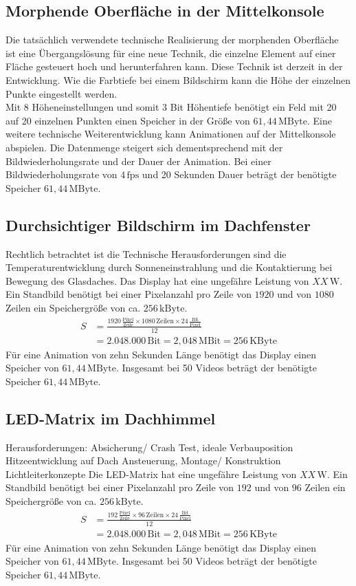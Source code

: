 \subsection{Morphende Oberfläche in der Mittelkonsole}
Die tatsächlich verwendete technische Realisierung der morphenden Oberfläche ist eine Übergangslösung für eine neue Technik, die einzelne Element auf einer Fläche gesteuert hoch und herunterfahren kann. Diese Technik ist derzeit in der Entwicklung. Wie die Farbtiefe bei einem Bildschirm kann die Höhe der einzelnen Punkte eingestellt werden. \\
Mit 8 Höheneinstellungen und somit 3 Bit Höhentiefe benötigt ein Feld mit 20 auf 20 einzelnen Punkten einen Speicher in der Größe von $ 61,44\,\mathrm{MByte}$.
Eine weitere technische Weiterentwicklung kann Animationen auf der Mittelkonsole abspielen. Die Datenmenge steigert sich dementsprechend mit der Bildwiederholungsrate und der Dauer der Animation. Bei einer Bildwiederholungsrate von $ 4\,\mathrm{fps} $ und 20 Sekunden Dauer beträgt der benötigte Speicher $ 61,44\,\mathrm{MByte}$.
\subsection{Durchsichtiger Bildschirm im Dachfenster}
Rechtlich betrachtet ist die 
Technische Herausforderungen sind die Temperaturentwicklung durch Sonneneinstrahlung und die Kontaktierung bei Bewegung des Glasdaches.
Das Display hat eine ungefähre Leistung von $ XX\,\mathrm{W} $. 
Ein Standbild benötigt bei einer Pixelanzahl pro Zeile von $ 1920 $ und von $ 1080 $ Zeilen ein Speichergröße von ca. $ 256\,\mathrm{kByte}$. 
\begin{align}
	S &= \frac{1920\,\frac{\mathrm{Pixel}}{\mathrm{Zeile}}\times 1080\,\mathrm{Zeilen} \times 24\,\frac{\mathrm{Bit}}{\mathrm{Pixel}}}{12} \\
	&= 2.048.000\,\mathrm{Bit} = 2,048\,\mathrm{MBit} = 256\,\mathrm{KByte}
\end{align}
Für eine Animation von zehn Sekunden Länge benötigt das Display einen Speicher von $ 61,44\,\mathrm{MByte}$.
Insgesamt bei 50 Videos beträgt der benötigte Speicher $ 61,44\,\mathrm{MByte}$.
\subsection{LED-Matrix im Dachhimmel}
Herausforderungen:
Absicherung/ Crash Test, ideale Verbauposition
Hitzeentwicklung auf Dach
Ansteuerung, Montage/ Konstruktion
Lichtleiterkonzepte
Die LED-Matrix hat eine ungefähre Leistung von $ XX\,\mathrm{W} $. 
Ein Standbild benötigt bei einer Pixelanzahl pro Zeile von $ 192 $ und von $ 96 $ Zeilen ein Speichergröße von ca. $ 256\,\mathrm{kByte}$. 
\begin{align}
	S &= \frac{192\,\frac{\mathrm{Pixel}}{\mathrm{Zeile}}\times 96\,\mathrm{Zeilen} \times 24\,\frac{\mathrm{Bit}}{\mathrm{Pixel}}}{12} \\
	&= 2.048.000\,\mathrm{Bit} = 2,048\,\mathrm{MBit} = 256\,\mathrm{KByte}
\end{align}
Für eine Animation von zehn Sekunden Länge benötigt das Display einen Speicher von $ 61,44\,\mathrm{MByte}$.
Insgesamt bei 50 Videos beträgt der benötigte Speicher $ 61,44\,\mathrm{MByte}$.
